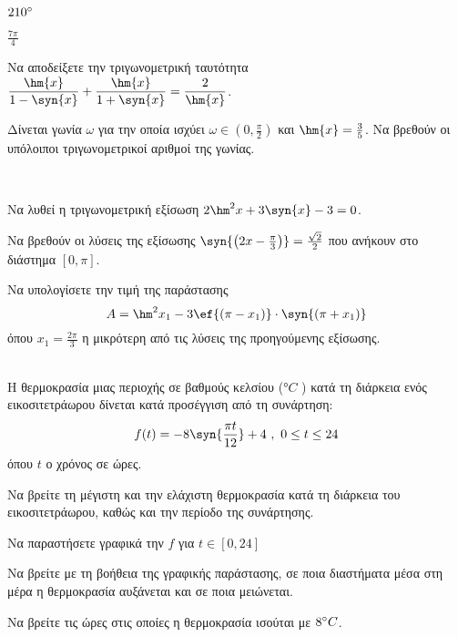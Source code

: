 \documentclass[11pt,a4paper]{article}
\begin{document}
\begin{thema}
\begin{erwthma}
\begin{multicols}{2}
\begin{alist}
\item $210\degree$
\item $\frac{7\pi}{4}$
\end{alist}
\end{multicols}
\item Να αποδείξετε την τριγωνομετρική ταυτότητα $\dfrac{\hm{x}}{1-\syn{x}}+\dfrac{\hm{x}}{1+\syn{x}}=\dfrac{2}{\hm{x}}$.
\item Δίνεται γωνία $\omega$ για την οποία ισχύει $\omega\in\left(0,\frac{\pi}{2}\right)$ και $\hm{x}=\frac{3}{5}$. Να βρεθούν οι υπόλοιποι τριγωνομετρικοί αριθμοί της γωνίας.
\end{erwthma}
\item\mbox{}\\\vspace{-5mm}
\begin{erwthma}
\item Να λυθεί η τριγωνομετρική εξίσωση $2\hm^2{x}+3\syn{x}-3=0$.
\item Να βρεθούν οι λύσεις της εξίσωσης $ \syn{\left(2x-\frac{\pi}{3}\right)}=\frac{\sqrt{2}}{2} $ που ανήκουν στο διάστημα $[0,\pi]$.
\item Να υπολογίσετε την τιμή της παράστασης
\[ A=\hm^2{x_1}-3\ef{(\pi-x_1)}\cdot\syn{(\pi+x_1)} \]
όπου $x_1=\frac{2\pi}{3}$ η μικρότερη από τις λύσεις της προηγούμενης εξίσωσης.
\end{erwthma}
\item\mbox{}\\Η θερμοκρασία μιας περιοχής σε βαθμούς κελσίου (°$C$ ) κατά τη διάρκεια ενός εικοσιτετράωρου
δίνεται κατά προσέγγιση από τη συνάρτηση:
\[ f(t)=-8\syn{\frac{\pi t}{12}}+4\ ,\ 0\leq t\leq 24 \]
όπου $t$ ο χρόνος σε ώρες.
\begin{erwthma}
\item Να βρείτε τη μέγιστη και την ελάχιστη θερμοκρασία κατά τη διάρκεια του εικοσιτετράωρου, καθώς και την περίοδο της συνάρτησης.
\item Να παραστήσετε γραφικά την $f$ για $t\in[0,24]$
\item Να βρείτε με τη βοήθεια της γραφικής παράστασης, σε ποια διαστήματα μέσα στη μέρα η θερμοκρασία
αυξάνεται και σε ποια μειώνεται.
\item Να βρείτε τις ώρες στις οποίες η θερμοκρασία ισούται με $ 8\degree C $.
\end{erwthma}
\end{thema}
\end{document}
